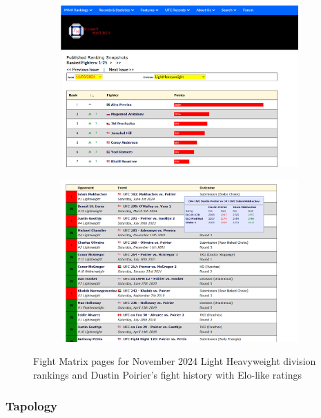 \documentclass[12pt,twoside]{report}
\begin{document}
\begin{figure}[htb]
\centering
\captionsetup{justification=centering}
\begin{subfigure}{.5\linewidth}
  \centering
  \includegraphics[width=0.95\linewidth]{figures/fightmatrix1.png}
\end{subfigure}%
\begin{subfigure}{.5\linewidth}
  \centering
  \includegraphics[width=0.95\linewidth]{figures/fightmatrix2.png}
\end{subfigure}
\caption{Fight Matrix pages for November 2024 Light Heavyweight division rankings and Dustin Poirier's fight history with Elo-like ratings}
\end{figure}


\subsubsection{Tapology}
\end{document}
